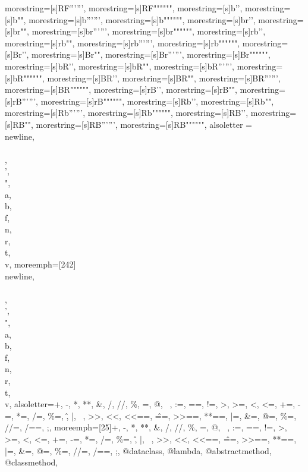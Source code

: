 {  morestring=[s]{RF'''}{'''}, morestring=[s]{RF"""}{"""},
  morestring=[s]{b'}{'}, morestring=[s]{b"}{"},
  morestring=[s]{b'''}{'''}, morestring=[s]{b"""}{"""},
  morestring=[s]{br'}{'}, morestring=[s]{br"}{"},
  morestring=[s]{br'''}{'''}, morestring=[s]{br"""}{"""},
  morestring=[s]{rb'}{'}, morestring=[s]{rb"}{"},
  morestring=[s]{rb'''}{'''}, morestring=[s]{rb"""}{"""},
  morestring=[s]{Br'}{'}, morestring=[s]{Br"}{"},
  morestring=[s]{Br'''}{'''}, morestring=[s]{Br"""}{"""},
  morestring=[s]{bR'}{'}, morestring=[s]{bR"}{"},
  morestring=[s]{bR'''}{'''}, morestring=[s]{bR"""}{"""},
  morestring=[s]{BR'}{'}, morestring=[s]{BR"}{"},
  morestring=[s]{BR'''}{'''}, morestring=[s]{BR"""}{"""},
  morestring=[s]{rB'}{'}, morestring=[s]{rB"}{"},
  morestring=[s]{rB'''}{'''}, morestring=[s]{rB"""}{"""},
  morestring=[s]{Rb'}{'}, morestring=[s]{Rb"}{"},
  morestring=[s]{Rb'''}{'''}, morestring=[s]{Rb"""}{"""},
  morestring=[s]{RB'}{'}, morestring=[s]{RB"}{"},
  morestring=[s]{RB'''}{'''}, morestring=[s]{RB"""}{"""},
  alsoletter = {\\newline,\\\\,\\',\\",\\a,\\b,\\f,\\n,\\r,\\t,\\v},
  moreemph=[242]{\\newline,\\\\,\\',\\",\\a,\\b,\\f,\\n,\\r,\\t,\\v},
  alsoletter={+, -, *, **, \&, /, //, \%, =, @, ~, :=, ==, !=, >, >=, <, <=,
  +=, -=, *=, /=, \%=, \^, |, ~, >>, <<, <<==, \^==, >>==, **==, |=, \&=, @=,
  \%=, //=, /==, ;},
  moreemph=[25]{+, -, *, **, \&, /, //, \%, =, @, ~, :=, ==, !=, >, >=, <, <=,
  +=, -=, *=, /=, \%=, \^, |, ~, >>, <<, <<==, \^==, >>==, **==, |=, \&=, @=,
  \%=, //=, /==, ;, @dataclass, @lambda, @abstractmethod, @classmethod,
}}
